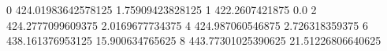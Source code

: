 0 424.01983642578125 1.75909423828125
1 422.2607421875 0.0
2 424.2777099609375 2.0169677734375
4 424.987060546875 2.726318359375
6 438.161376953125 15.900634765625
8 443.77301025390625 21.51226806640625
